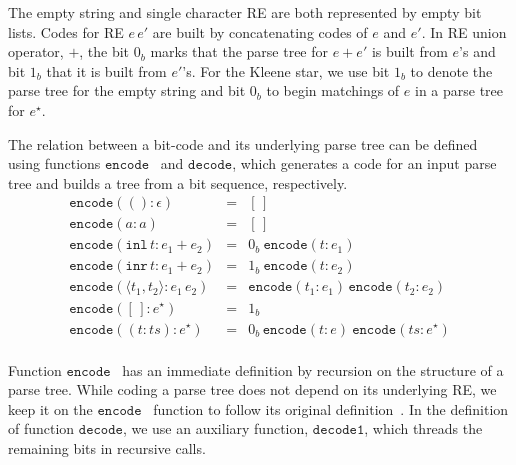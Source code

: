 \documentclass[review]{elsarticle}
\newcommand{\inl}{\ensuremath{\texttt{inl}}}
\newcommand{\inr}{\ensuremath{\texttt{inr}}}
\newcommand{\code}{\ensuremath{\texttt{encode}}}
\newcommand{\decodee}{\ensuremath{\texttt{decode}}}
\newcommand{\decodeo}{\ensuremath{\texttt{decode1}}}
\theoremstyle{definition}
\begin{document}
The empty string and single character RE are both represented by empty bit lists. Codes for RE $e\,e'$ are
built by concatenating codes of $e$ and $e'$. In RE union operator, $+$, the bit $0_b$ marks that the
parse tree for $e + e'$ is built from $e$'s and bit $1_b$ that it is built from $e'$'s. For the Kleene
star, we use bit $1_b$ to denote the parse tree for the empty string and bit $0_b$ to begin matchings of $e$
in a parse tree for $e^\star$.

The relation between a bit-code and its underlying parse tree can be defined using functions
\code~ and \decodee, which generates a code for an input parse tree and builds a tree from a bit sequence, 
respectively. 
\[
\begin{array}{lcl}
   \code (() : \epsilon) & = & [\,]\\
   \code (a : a)         & = & [\,]\\
   \code (\inl\,t : e_1 + e_2) & = & 0_b\:\code(t : e_1)\\ 
   \code (\inr\,t : e_1 + e_2) & = & 1_b\:\code(t : e_2)\\
   \code (\langle t_1, t_2\rangle : e_1\,e_2) & = & \code (t_1 : e_1)\,\code(t_2 : e_2)\\
   \code ([\,] : e^\star) & = & 1_b\\
   \code ((t : ts) : e^\star) & = & 0_b\,\code (t : e)\:\code(ts : e^\star)\\ 
\end{array}
\]

Function \code~ has an immediate definition by recursion on the structure of a parse tree.
While coding a parse tree does not depend on its underlying RE, we keep it on
the \code~ function to follow its original definition~\cite{Lasse2011}.
In the definition of function \decodee, we use an auxiliary function, \decodeo, which 
threads the remaining bits in recursive calls.
\end{document}

